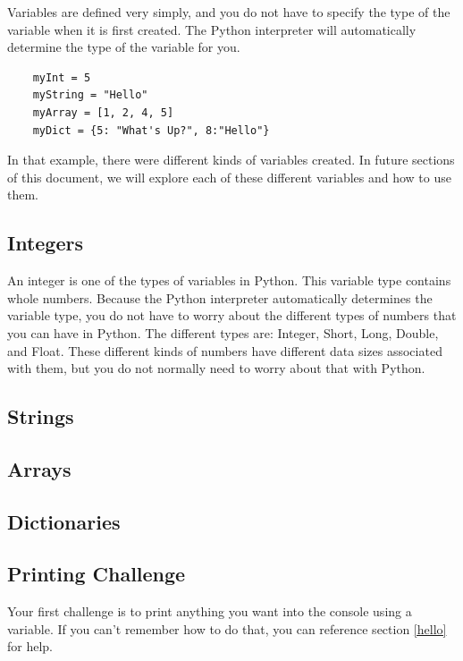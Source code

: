 \documentclass[12pt, letterpaper]{article}
\begin{document}
    Variables are defined very simply, and you do not have to specify the type of the variable when it is first created. The Python interpreter will automatically determine the type of the variable for you.

    \begin{verbatim}
    myInt = 5
    myString = "Hello"
    myArray = [1, 2, 4, 5]
    myDict = {5: "What's Up?", 8:"Hello"}
    \end{verbatim}

    In that example, there were different kinds of variables created. In future sections of this document, we will explore each of these different variables and how to use them.

    \subsection{Integers} \label{integers}

    An integer is one of the types of variables in Python. This variable type contains whole numbers. Because the Python interpreter automatically determines the variable type, you do not have to worry about the different types of numbers that you can have in Python. The different types are: Integer, Short, Long, Double, and Float. These different kinds of numbers have different data sizes associated with them, but you do not normally need to worry about that with Python.

    \subsection{Strings} \label{strings}

    \subsection{Arrays} \label{arrays}
    
    \subsection{Dictionaries} \label{dictionaries}

    \subsection{Printing Challenge} \label{hellochallenge}
    
    Your first challenge is to print anything you want into the console using a variable. If you can't remember how to do that, you can reference section \ref{hello} for help.
\end{document}
